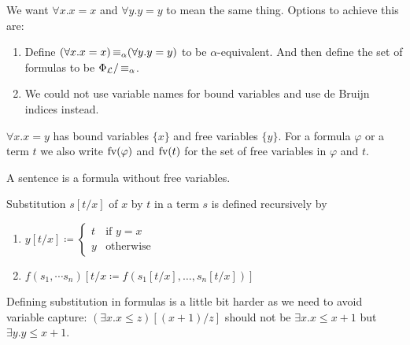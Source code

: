 \begin{rem}
We want $\forall x. x = x$ and $\forall y. y = y$ to mean the same thing. 
Options to achieve this are: 
\begin{enumerate}
    \item Define $(\forall x. x = x) \operatorname{\equiv_{\alpha}} (\forall y. y = y)$ to be \alert{$\alpha$-equivalent}. And then define the set of formulas to be $\Phi_{\mathcal{L}} / \operatorname{\equiv_{\alpha}}$.
    \item We could not use variable names for bound variables and use \alert{de Bruijn indices} instead.
\end{enumerate}
\end{rem}

\begin{rem}
    $\forall x. x = y$ has \alert{bound variables} $\{x\}$ and \alert{free variables} $\{y\}$. For a formula $\varphi$ or a term $t$ we also write \alert{$\text{fv}(\varphi)$} and \alert{$\text{fv}(t)$} for the set of free variables in $\varphi$ and $t$.
\end{rem}

\begin{defi}
    A \alert{sentence} is a formula without free variables.
\end{defi}

\begin{defi}
    \alert{Substitution $s[t/x]$} of $x$ by $t$ in a term $s$ is defined recursively by 
    \begin{enumerate}
        \item {$ y[t/x] \coloneq 
                \begin{cases}
                    t & \text{if } y = x \\
                    y & \text{otherwise}
                \end{cases}$}
        \item $f(s_1, \dotsm s_n)[t/x \coloneq f(s_1[t/x], \dots, s_n[t/x])]$
    \end{enumerate}
\end{defi}

\begin{example}
    Defining substitution in formulas is a little bit harder as we need to avoid \alert{variable capture}:
    $(\exists x. x \leq z)[(x + 1)/z]$ should not be $\exists x. x \leq x + 1$ but $\exists y. y \leq x + 1$.
\end{example}

